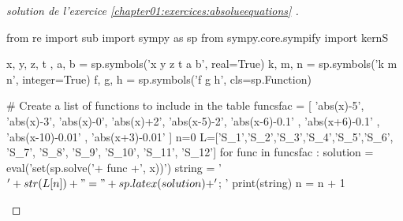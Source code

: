 \documentclass[main.tex]{subfiles}
\begin{document}
\begin{proof}[solution de l'exercice  \ref{chapter01:exercices:absolueequations} ] \hfill 
	
\begin{pycode}
from re import sub
import sympy as sp
from sympy.core.sympify import kernS

x, y, z, t , a, b = sp.symbols('x y z t a b', real=True)
k, m, n = sp.symbols('k m n', integer=True)
f, g, h = sp.symbols('f g h', cls=sp.Function)

# Create a list of functions to include in the table
funcsfac = [ 
'abs(x)-5',
'abs(x)-3',
'abs(x)-0',
'abs(x)+2',
'abs(x-5)-2',
'abs(x-6)-0.1' ,
'abs(x+6)-0.1' ,
'abs(x-10)-0.01' ,
'abs(x+3)-0.01' 
]
n=0
L=['S_1','S_2','S_3','S_4','S_5','S_6', 'S_7', 'S_8', 'S_9', 'S_{10}', 'S_{11}', 'S_{12}']
for func in funcsfac :
	solution =   eval('set(sp.solve('+ func +', x))')
	string =  '$'+ str(L[n])  + "=" + sp.latex(solution ) + '$; '
	print(string)
	n     = n + 1
\end{pycode}
\end{proof}
%	 
 

%	 
\clearpage
{}  
\pagestyle{plain.scrheadings} %
\doublespacing 


\tikzset{
	set angles for level/.style={level #1/.append style={sibling angle=360/(\the\tikznumberofchildren+4)}},
	level/.append code={
		\edef\tempa{#1}\edef\tempb{1}
		\ifx\tempa\tempb\tikzset{level 1/.append style={sibling angle=360/\the\tikznumberofchildren}}\else\tikzset{set angles for level=#1}\fi},
non-concept/.style={
	rectangle,
	text width=15em,
	text=black,
	align=left,
	font=\large,
},
cncc/.style={ edge from parent path={ (\tikzparentnode.#1) to [bend right] (\tikzchildnode)   } },
}
\end{document}
